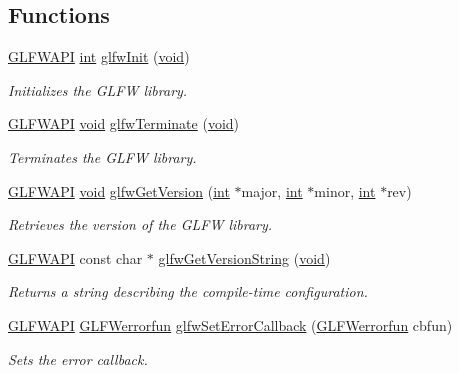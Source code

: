 \subsection*{Functions}
\begin{DoxyCompactItemize}
\item 
\hyperlink{glfw3_8h_a56da5036b2cc259351ae22fd6439bb47}{G\+L\+F\+W\+A\+P\+I} \hyperlink{wglew_8h_a500a82aecba06f4550f6849b8099ca21}{int} \hyperlink{group__init_gab41771f0215a2e0afb4cf1cf98082d40}{glfw\+Init} (\hyperlink{wglew_8h_aeea6e3dfae3acf232096f57d2d57f084}{void})
\begin{DoxyCompactList}\small\item\em Initializes the G\+L\+F\+W library. \end{DoxyCompactList}\item 
\hyperlink{glfw3_8h_a56da5036b2cc259351ae22fd6439bb47}{G\+L\+F\+W\+A\+P\+I} \hyperlink{wglew_8h_aeea6e3dfae3acf232096f57d2d57f084}{void} \hyperlink{group__init_gafd90e6fd4819ea9e22e5e739519a6504}{glfw\+Terminate} (\hyperlink{wglew_8h_aeea6e3dfae3acf232096f57d2d57f084}{void})
\begin{DoxyCompactList}\small\item\em Terminates the G\+L\+F\+W library. \end{DoxyCompactList}\item 
\hyperlink{glfw3_8h_a56da5036b2cc259351ae22fd6439bb47}{G\+L\+F\+W\+A\+P\+I} \hyperlink{wglew_8h_aeea6e3dfae3acf232096f57d2d57f084}{void} \hyperlink{group__init_ga2402c7824ac0194c13722790ff9559ff}{glfw\+Get\+Version} (\hyperlink{wglew_8h_a500a82aecba06f4550f6849b8099ca21}{int} $\ast$major, \hyperlink{wglew_8h_a500a82aecba06f4550f6849b8099ca21}{int} $\ast$minor, \hyperlink{wglew_8h_a500a82aecba06f4550f6849b8099ca21}{int} $\ast$rev)
\begin{DoxyCompactList}\small\item\em Retrieves the version of the G\+L\+F\+W library. \end{DoxyCompactList}\item 
\hyperlink{glfw3_8h_a56da5036b2cc259351ae22fd6439bb47}{G\+L\+F\+W\+A\+P\+I} const char $\ast$ \hyperlink{group__init_ga4b9092ac5eace57d94d3cd551d6b8ded}{glfw\+Get\+Version\+String} (\hyperlink{wglew_8h_aeea6e3dfae3acf232096f57d2d57f084}{void})
\begin{DoxyCompactList}\small\item\em Returns a string describing the compile-\/time configuration. \end{DoxyCompactList}\item 
\hyperlink{glfw3_8h_a56da5036b2cc259351ae22fd6439bb47}{G\+L\+F\+W\+A\+P\+I} \hyperlink{group__init_ga6b8a2639706d5c409fc1287e8f55e928}{G\+L\+F\+Werrorfun} \hyperlink{group__init_ga5919096b958c47102126061fb5a6f9c3}{glfw\+Set\+Error\+Callback} (\hyperlink{group__init_ga6b8a2639706d5c409fc1287e8f55e928}{G\+L\+F\+Werrorfun} cbfun)
\begin{DoxyCompactList}\small\item\em Sets the error callback. \end{DoxyCompactList}\end{DoxyCompactItemize}
